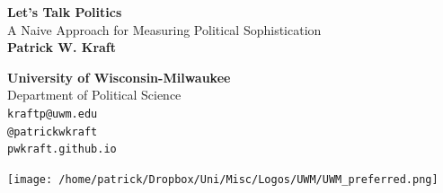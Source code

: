 \documentclass[a0,landscape]{a0poster}
\begin{document}


\begin{minipage}[b]{0.51\linewidth}
\veryHuge \color{NavyBlue} \textbf{Let's Talk Politics} \color{Black}\\[.5cm] %
\Huge A Naive Approach for Measuring Political Sophistication\\[1cm] %
\huge \textbf{Patrick W. Kraft} %
\end{minipage}
%
\begin{minipage}[b]{0.25\linewidth}
\color{DarkSlateGray}\Large \textbf{University of Wisconsin-Milwaukee}\\
Department of Political Science\\ %
\faEnvelope\hspace{.2em} \texttt{kraftp@uwm.edu}\\ %
\faTwitter\hspace{.2em} \texttt{@patrickwkraft}\\ %
\faGlobe\hspace{.2em} \texttt{pwkraft.github.io} %
\end{minipage}
%
\begin{minipage}[b]{0.25\linewidth}
\texttt{[image: /home/patrick/Dropbox/Uni/Misc/Logos/UWM/UWM\_preferred.png]}
\end{minipage}
%


\vspace{1cm} %
\end{document}
